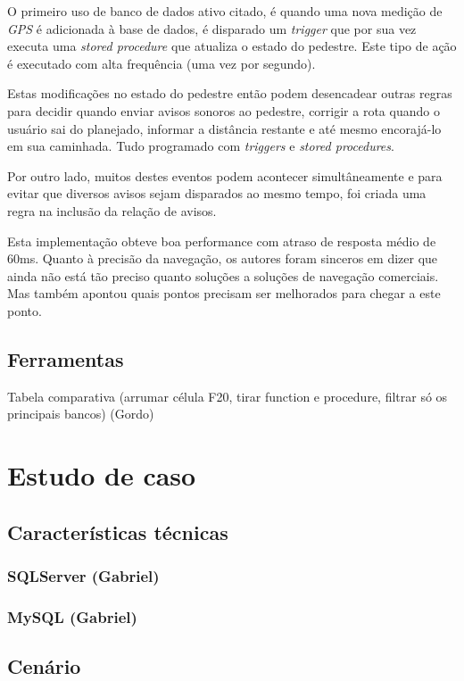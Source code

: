 \documentclass[conference]{IEEEtran}
\begin{document}
    O primeiro uso de banco de dados ativo citado, é quando uma nova medição de \textit{GPS} é adicionada à base de dados, é disparado um \textit{trigger} que por sua vez executa uma \textit{stored procedure} que atualiza o estado do pedestre. Este tipo de ação é executado com alta frequência (uma vez por segundo).

    Estas modificações no estado do pedestre então podem desencadear outras regras para decidir quando enviar avisos sonoros ao pedestre, corrigir a rota quando o usuário sai do planejado, informar a distância restante e até mesmo encorajá-lo em sua caminhada. Tudo programado com \textit{triggers} e \textit{stored procedures}.

    Por outro lado, muitos destes eventos podem acontecer simultâneamente e para evitar que diversos avisos sejam disparados ao mesmo tempo, foi criada uma regra na inclusão da relação de avisos.

    Esta implementação obteve boa performance com atraso de resposta médio de 60ms. Quanto à precisão da navegação, os autores foram sinceros em dizer que ainda não está tão preciso quanto soluções a soluções de navegação comerciais. Mas também apontou quais pontos precisam ser melhorados para chegar a este ponto.

  \subsection{Ferramentas}
  Tabela comparativa (arrumar célula F20, tirar function e procedure, filtrar só os principais bancos) (Gordo)

\section{Estudo de caso}
  \subsection{Características técnicas}
    \subsubsection{SQLServer (Gabriel)}
    \subsubsection{MySQL (Gabriel)}

  \subsection{Cenário}
\end{document}
